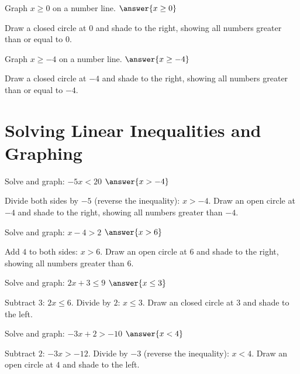 \documentclass{ximera}
\begin{document}
\begin{problem}
Graph $x \geq 0$ on a number line. $\answer{x \geq 0}$
\begin{feedback}
Draw a closed circle at $0$ and shade to the right, showing all numbers greater than or equal to $0$.
\end{feedback}
\end{problem}

\begin{problem}
Graph $x \geq -4$ on a number line. $\answer{x \geq -4}$
\begin{feedback}
Draw a closed circle at $-4$ and shade to the right, showing all numbers greater than or equal to $-4$.
\end{feedback}
\end{problem}


\section*{Solving Linear Inequalities and Graphing}


\begin{problem}
Solve and graph: $-5x < 20$ $\answer{x > -4}$
\begin{feedback}
Divide both sides by $-5$ (reverse the inequality): $x > -4$. Draw an open circle at $-4$ and shade to the right, showing all numbers greater than $-4$.
\end{feedback}
\end{problem}

\begin{problem}
Solve and graph: $x - 4 > 2$ $\answer{x > 6}$
\begin{feedback}
Add $4$ to both sides: $x > 6$. Draw an open circle at $6$ and shade to the right, showing all numbers greater than $6$.
\end{feedback}
\end{problem}

\begin{problem}
Solve and graph: $2x + 3 \leq 9$ $\answer{x \leq 3}$
\begin{feedback}
Subtract $3$: $2x \leq 6$. Divide by $2$: $x \leq 3$. Draw an closed circle at $3$ and shade to the left.
\end{feedback}
\end{problem}

\begin{problem}
Solve and graph: $-3x + 2 > -10$ $\answer{x < 4}$
\begin{feedback}
Subtract $2$: $-3x > -12$. Divide by $-3$ (reverse the inequality): $x < 4$. Draw an open circle at $4$ and shade to the left.
\end{feedback}
\end{problem}
\end{document}
